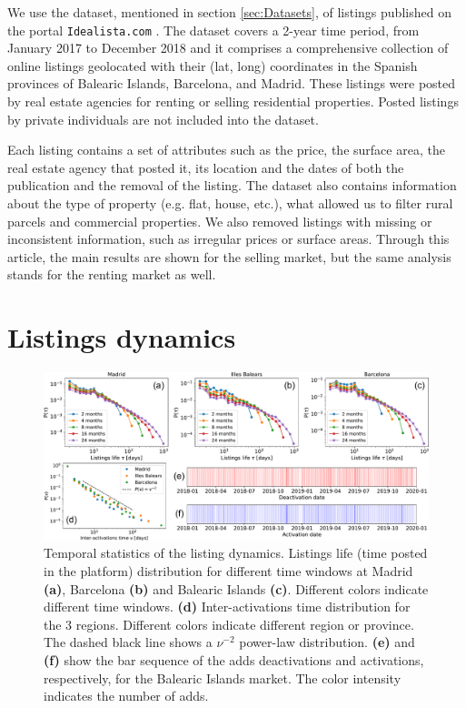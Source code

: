 We use the dataset, mentioned in section \ref{sec:Datasets}, of listings published on the portal \texttt{Idealista.com} \cite{idealista}. The dataset covers a 2-year time period, from January 2017 to December 2018 and it comprises a comprehensive collection of online listings geolocated with their (lat, long) coordinates in the Spanish provinces of Balearic Islands, Barcelona, and Madrid. These listings were posted by real estate agencies for renting or selling residential properties. Posted listings by private individuals are not included into the dataset.

Each listing contains a set of attributes such as the price, the surface area, the real estate agency that posted it, its location and the dates of both the publication and the removal of the listing. The dataset also contains information about the type of property (e.g. flat, house, etc.), what allowed us to filter rural parcels and commercial properties. We also removed listings with missing or inconsistent information, such as irregular prices or surface areas. Through this article, the main results are shown for the selling market, but the same analysis stands for the renting market as well.

\section{Listings dynamics}

\begin{figure}
    \centering
    \includegraphics[width =\textwidth]{Figs/Idealista_dynamics/panel_time.pdf}
	\caption[Temporal statistics of the listing dynamics.]{ \label{fig:panel_time} Temporal statistics of the listing dynamics. Listings life (time posted in the platform) distribution for different time windows at Madrid \textbf{(a)}, Barcelona \textbf{(b)} and Balearic Islands \textbf{(c)}. Different colors indicate different time windows. \textbf{(d)} Inter-activations time distribution for the 3 regions. Different colors indicate different region or province. The dashed black line shows a $\nu^{-2}$ power-law distribution. \textbf{(e)} and \textbf{(f)} show the bar sequence of the adds deactivations and activations, respectively, for the Balearic Islands market. The color intensity indicates the number of adds.}
\end{figure}

